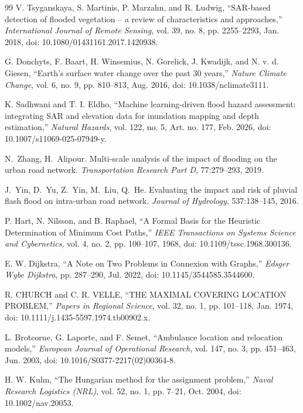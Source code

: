 \documentclass[10pt,twocolumn]{article}
\begin{document}
{\begin{thebibliography}{99}
V. Tsyganskaya, S. Martinis, P. Marzahn, and R. Ludwig, ``SAR-based detection of flooded vegetation -- a review of characteristics and approaches,'' \emph{International Journal of Remote Sensing}, vol. 39, no. 8, pp. 2255--2293, Jan. 2018, doi: 10.1080/01431161.2017.1420938.

G. Donchyts, F. Baart, H. Winsemius, N. Gorelick, J. Kwadijk, and N. v. d. Giesen, ``Earth's surface water change over the past 30 years,'' \emph{Nature Climate Change}, vol. 6, no. 9, pp. 810--813, Aug. 2016, doi: 10.1038/nclimate3111.

K. Sadhwani and T. I. Eldho, ``Machine learning-driven flood hazard assessment: integrating SAR and elevation data for inundation mapping and depth estimation,'' \emph{Natural Hazards}, vol. 122, no. 5, Art. no. 177, Feb. 2026, doi: 10.1007/s11069-025-07949-y.

N.~Zhang, H.~Alipour. Multi-scale analysis of the impact of flooding on the urban road network. \emph{Transportation Research Part D}, 77:279--293, 2019.

J.~Yin, D.~Yu, Z.~Yin, M.~Liu, Q.~He. Evaluating the impact and risk of pluvial flash flood on intra-urban road network. \emph{Journal of Hydrology}, 537:138--145, 2016.

P. Hart, N. Nilsson, and B. Raphael, ``A Formal Basis for the Heuristic Determination of Minimum Cost Paths,'' \emph{IEEE Transactions on Systems Science and Cybernetics}, vol. 4, no. 2, pp. 100--107, 1968, doi: 10.1109/tssc.1968.300136.

E. W. Dijkstra, ``A Note on Two Problems in Connexion with Graphs,'' \emph{Edsger Wybe Dijkstra}, pp. 287--290, Jul. 2022, doi: 10.1145/3544585.3544600.

R. CHURCH and C. R. VELLE, ``THE MAXIMAL COVERING LOCATION PROBLEM,'' \emph{Papers in Regional Science}, vol. 32, no. 1, pp. 101--118, Jan. 1974, doi: 10.1111/j.1435-5597.1974.tb00902.x.

L. Brotcorne, G. Laporte, and F. Semet, ``Ambulance location and relocation models,'' \emph{European Journal of Operational Research}, vol. 147, no. 3, pp. 451--463, Jun. 2003, doi: 10.1016/S0377-2217(02)00364-8.

H. W. Kuhn, ``The Hungarian method for the assignment problem,'' \emph{Naval Research Logistics (NRL)}, vol. 52, no. 1, pp. 7--21, Oct. 2004, doi: 10.1002/nav.20053.


\end{thebibliography}}
\end{document}

